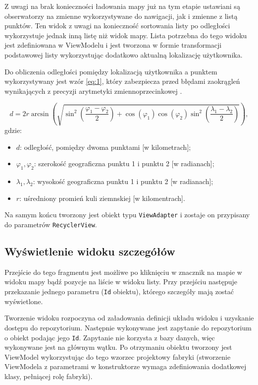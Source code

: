 \documentclass[polish,polish,a4paper,12pt]{article}
\begin{document}
	Z uwagi na brak konieczności ładowania mapy już na tym etapie ustawiani są obserwatorzy na zmienne wykorzystywane do nawigacji, jak i zmienne z listą punktów. Ten widok z uwagi na konieczność sortowania listy po odległości wykorzystuje jednak inną listę niż widok mapy. Lista potrzebna do tego widoku jest zdefiniowana w ViewModelu i jest tworzona w formie transformacji podstawowej listy wykorzystując dodatkowo aktualną lokalizację użytkownika.

	Do obliczenia odległości pomiędzy lokalizacją użytkownika a punktem wykorzystywany jest wzór \ref{eq:1}, który zabezpiecza przed błędami zaokrągleń wynikających z precyzji arytmetyki zmiennoprzecinkowej \cite{haversineformulawiki}.

	\begin{equation}
d = 2r\arcsin(\sqrt{\sin^2(\frac{\varphi_1-\varphi_2}{2})+\cos(\varphi_1)\cos(\varphi_2)\sin^2(\frac{\lambda_1-\lambda_2}{2})}),\label{eq:1}
	\end{equation}
	gdzie:
	\begin{itemize}
		\item $ d $: odległość, pomiędzy dwoma punktami [w kilometrach];
		\item $ \varphi_1, \varphi_2 $: szerokość geograficzna punktu 1 i punktu 2 [w radianach];
		\item $ \lambda_1, \lambda_2 $: wysokość geograficzna punktu 1 i punktu 2 [w radianach];
		\item $ r $: uśredniony promień kuli ziemnskiej [w kilomentrach].
	\end{itemize}

	Na samym końcu tworzony jest obiekt typu \texttt{ViewAdapter} i zostaje on przypisany do parametrów \texttt{RecyclerView}.

	\subsection{Wyświetlenie widoku szczegółów}

	Przejście do tego fragmentu jest możliwe po kliknięciu w znacznik na mapie w widoku mapy bądź pozycje na liście w widoku listy. Przy przejściu następuje przekazanie jednego parametru (\texttt{Id} obiektu), którego szczegóły mają zostać wyświetlone.

	Tworzenie widoku rozpoczyna od załadowania definicji układu widoku i uzyskanie dostępu do repozytorium. Następnie wykonywane jest zapytanie do repozytorium o obiekt podając jego \texttt{Id}. Zapytanie nie korzysta z bazy danych, więc wykonywane jest na głównym wątku. Po otrzymaniu obiektu tworzony jest ViewModel wykorzystując do tego wzorzec projektowy fabryki (stworzenie ViewModela z parametrami w konstruktorze wymaga zdefiniowania dodatkowej klasy, pełniącej rolę fabryki).
\end{document}

